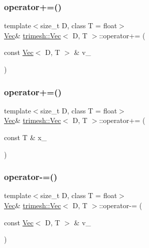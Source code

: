 \subsubsection{\texorpdfstring{operator+=()}{operator+=()}\hspace{0.1cm}{\footnotesize\ttfamily [1/2]}}
{\footnotesize\ttfamily template$<$size\+\_\+t D, class T = float$>$ \\
\hyperlink{classtrimesh_1_1Vec}{Vec}\& \hyperlink{classtrimesh_1_1Vec}{trimesh\+::\+Vec}$<$ D, T $>$\+::operator+= (\begin{DoxyParamCaption}\item[{const \hyperlink{classtrimesh_1_1Vec}{Vec}$<$ D, T $>$ \&}]{v\+\_\+ }\end{DoxyParamCaption})\hspace{0.3cm}{\ttfamily [inline]}}

\mbox{\label{classtrimesh_1_1Vec_ad4aa4f1a863bcb61e8989f26e348f6c4}} 
\subsubsection{\texorpdfstring{operator+=()}{operator+=()}\hspace{0.1cm}{\footnotesize\ttfamily [2/2]}}
{\footnotesize\ttfamily template$<$size\+\_\+t D, class T = float$>$ \\
\hyperlink{classtrimesh_1_1Vec}{Vec}\& \hyperlink{classtrimesh_1_1Vec}{trimesh\+::\+Vec}$<$ D, T $>$\+::operator+= (\begin{DoxyParamCaption}\item[{const T \&}]{x\+\_\+ }\end{DoxyParamCaption})\hspace{0.3cm}{\ttfamily [inline]}}

\mbox{\label{classtrimesh_1_1Vec_a067d4171230e95c421e7cfbc9054b2c3}} 
\subsubsection{\texorpdfstring{operator-\/=()}{operator-=()}\hspace{0.1cm}{\footnotesize\ttfamily [1/2]}}
{\footnotesize\ttfamily template$<$size\+\_\+t D, class T = float$>$ \\
\hyperlink{classtrimesh_1_1Vec}{Vec}\& \hyperlink{classtrimesh_1_1Vec}{trimesh\+::\+Vec}$<$ D, T $>$\+::operator-\/= (\begin{DoxyParamCaption}\item[{const \hyperlink{classtrimesh_1_1Vec}{Vec}$<$ D, T $>$ \&}]{v\+\_\+ }\end{DoxyParamCaption})\hspace{0.3cm}{\ttfamily [inline]}}

